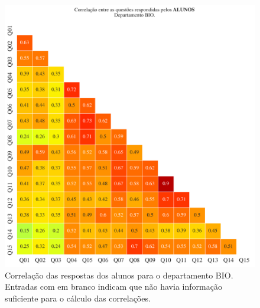 \documentclass[a4paper,10pt]{article}
\begin{document}
\begin{figure}[h]
\centering
\includegraphics[width=0.999\linewidth]{matriz_corr__BIO_alunos.png}
\caption{\label{fig:corr_alunos}Correlação das respostas dos alunos para o departamento BIO. Entradas com em branco indicam que não havia informação suficiente para o cálculo das correlações.}
\end{figure}
\end{document}
